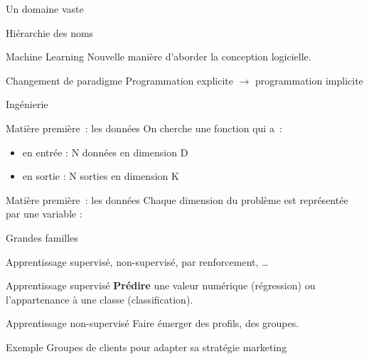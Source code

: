 \begin{frame}{Un domaine vaste}
\end{frame}

\begin{frame}{Hiérarchie des noms}
\end{frame}

\begin{frame}{Machine Learning}
  Nouvelle manière d'aborder la conception logicielle.
  \vfill
  \begin{block}{Changement de paradigme}
  Programmation explicite $\rightarrow$ programmation implicite
  \end{block}
\end{frame}

\begin{frame}{Ingénierie}
\end{frame}

\begin{frame}{Matière première~: les données}
  On cherche une fonction qui a~:
  \begin{itemize}
    \item en entrée : N données en dimension D
    \item en sortie : N sorties en dimension K
  \end{itemize}
\end{frame}

\begin{frame}{Matière première~: les données}
  Chaque dimension du problème est représentée par une variable : 
\end{frame}

\begin{frame}{Grandes familles}

  Apprentissage supervisé, non-supervisé, par renforcement, …
\end{frame}

\begin{frame}{Apprentissage supervisé}
  \textbf{Prédire} une valeur numérique (régression) ou l'appartenance à une classe (classification).
\end{frame}

\begin{frame}{Apprentissage non-supervisé}
  Faire émerger des profils, des groupes.
  \vfill
  \begin{exampleblock}{Exemple}
    Groupes de clients pour adapter sa stratégie marketing
  \end{exampleblock}
\end{frame}


